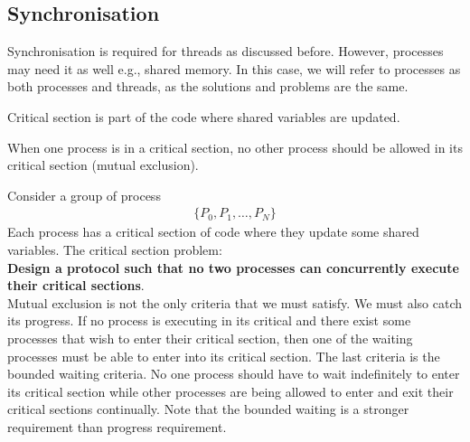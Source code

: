 \documentclass[a4paper]{article}
\theoremstyle{plain}
\theoremstyle{definition}
\newtheorem{defn}{Definition}[section]
\theoremstyle{remark}
\begin{document}
\subsection{Synchronisation}
Synchronisation is required for threads as discussed before. However, processes may need it as well e.g., shared memory. In this case, we will refer to processes as both processes and threads, as the solutions and problems are the same.
\begin{tcolorbox}[colback=black!3!white,colframe=black!60!white,title=\begin{defn}Critical Section \label{Critical Section}\end{defn}]
Critical section is part of the code where shared variables are updated.
\end{tcolorbox}
When one process is in a critical section, no other process should be allowed in its critical section (mutual exclusion). 
\begin{tcolorbox}[colback=black!3!white,colframe=black!60!white,title=\begin{defn}The Critical Section Problem \label{The Critical Section Problem}\end{defn}]
Consider a group of process
\begin{align*}
	\{P_0,P_1,\ldots,P_N\}
\end{align*}
Each process has a critical section of code where they update some shared variables. The critical section problem: \\
\textbf{Design a protocol such that no two processes can concurrently execute their critical sections}. \\
Mutual exclusion is not the only criteria that we must satisfy. We must also catch its progress. If no process is executing in its critical and there exist some processes that wish to enter their critical section, then one of the waiting processes must be able to enter into its critical section. The last criteria is the bounded waiting criteria. No one process should have to wait indefinitely to enter its critical section while other processes are being allowed to enter and exit their critical sections continually. Note that the bounded waiting is a stronger requirement than progress requirement. 
\end{tcolorbox}
\end{document}
